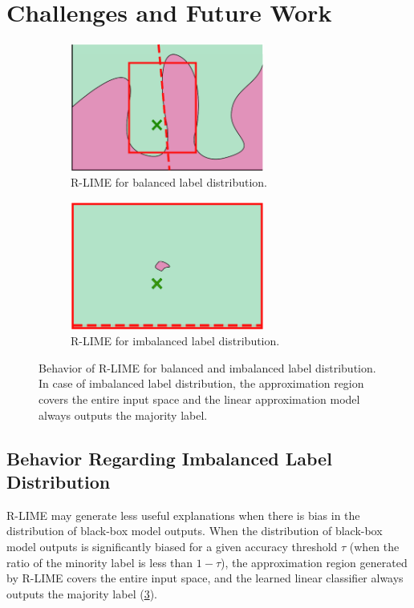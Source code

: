 \documentclass[11pt]{article}
\begin{document}
\section{Challenges and Future Work}
 {%
  \def\imgwidth{0.47\textwidth}
  \begin{figure}[t]
    \centering
    \begin{subfigure}[t]{\imgwidth}
      \centering
      \includegraphics[width=0.7\textwidth]{visual-rlime3}
      \caption{R-LIME for balanced label distribution.}\label{fig:balanced}
    \end{subfigure}
    \begin{subfigure}[t]{\imgwidth}
      \centering
      \includegraphics[width=0.7\textwidth]{visual-rlime-imbalanced}
      \caption{R-LIME for imbalanced label distribution.
      }\label{fig:imbalanced}
    \end{subfigure}
    \caption[Behavior of R-LIME for balanced and imbalanced label distribution]{%
      Behavior of R-LIME for balanced and imbalanced label distribution.
      In case of imbalanced label distribution,
      the approximation region covers the entire input space and the
      linear approximation model always outputs the majority label.
    }
  \end{figure}
 }

\subsection{Behavior Regarding Imbalanced Label Distribution}
R-LIME may generate less useful explanations
when there is bias in the distribution of black-box model outputs.
When the distribution of black-box model outputs is significantly biased
for a given accuracy threshold $\tau$
(when the ratio of the minority label is less than $1-\tau$),
the approximation region generated by R-LIME covers the entire input space,
and the learned linear classifier always outputs the majority label
(\cref{fig:imbalanced}).
\end{document}
